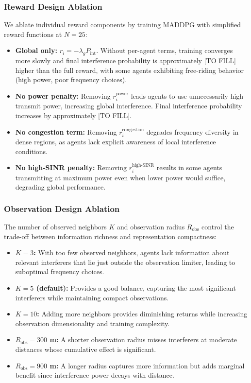 \documentclass[conference]{IEEEtran}
\begin{document}
\subsubsection{Reward Design Ablation}
We ablate individual reward components by training MADDPG with simplified reward functions at $N = 25$:
\begin{itemize}
    \item \textbf{Global only:} $r_i = -\lambda_g P_{\text{int}}$. Without per-agent terms, training converges more slowly and final interference probability is approximately [TO FILL] higher than the full reward, with some agents exhibiting free-riding behavior (high power, poor frequency choices).
    \item \textbf{No power penalty:} Removing $r_i^{\text{power}}$ leads agents to use unnecessarily high transmit power, increasing global interference. Final interference probability increases by approximately [TO FILL].
    \item \textbf{No congestion term:} Removing $r_i^{\text{congestion}}$ degrades frequency diversity in dense regions, as agents lack explicit awareness of local interference conditions.
    \item \textbf{No high-SINR penalty:} Removing $r_i^{\text{high-SINR}}$ results in some agents transmitting at maximum power even when lower power would suffice, degrading global performance.
\end{itemize}

\subsubsection{Observation Design Ablation}
The number of observed neighbors $K$ and observation radius $R_{\text{obs}}$ control the trade-off between information richness and representation compactness:
\begin{itemize}
    \item \textbf{$K=3$:} With too few observed neighbors, agents lack information about relevant interferers that lie just outside the observation limiter, leading to suboptimal frequency choices.
    \item \textbf{$K=5$ (default):} Provides a good balance, capturing the most significant interferers while maintaining compact observations.
    \item \textbf{$K=10$:} Adding more neighbors provides diminishing returns while increasing observation dimensionality and training complexity.
    \item \textbf{$R_{\text{obs}} = 300$ m:} A shorter observation radius misses interferers at moderate distances whose cumulative effect is significant.
    \item \textbf{$R_{\text{obs}} = 900$ m:} A longer radius captures more information but adds marginal benefit since interference power decays with distance.
\end{itemize}
\end{document}
